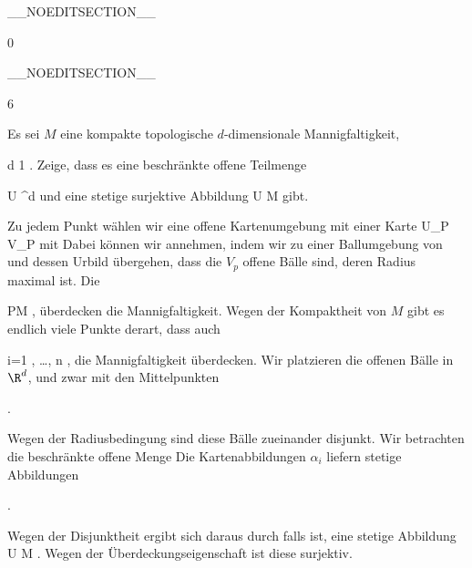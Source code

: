 __NOEDITSECTION__

{0}

{

}
{  }

__NOEDITSECTION__

{6}

{

Es sei $M$ eine kompakte topologische $d$-dimensionale Mannigfaltigkeit,

\mavergleichskette
{\vergleichskette
{ d
}
{ \geq }{ 1
}
{  }{
}
{    }{
}
{   }{
}
}
{}{}{.}
Zeige, dass es eine beschränkte offene Teilmenge

\mavergleichskette
{\vergleichskette
{ U
}
{ \subseteq }{ \R^d
}
{  }{
}
{    }{
}
{   }{
}
}
{}{}{}
und eine stetige surjektive Abbildung
\maabbdisp {\varphi} { U } { M
} {}
gibt.

}
{

Zu jedem Punkt
 wählen wir eine offene Kartenumgebung
 mit einer Karte
 {U_P } {V_P
} {}
mit
 Dabei können wir annehmen, indem wir zu einer Ballumgebung von
 und dessen Urbild übergehen, dass die $V_p$ offene Bälle sind, deren Radius maximal
 ist. Die

 {}
 {P\in M} {}
 {} {} {} {,}
überdecken die Mannigfaltigkeit. Wegen der Kompaktheit von $M$ gibt es endlich viele Punkte
 derart, dass auch

 {}
 {i=1 , \ldots , n} {}
 {} {} {} {,}
die Mannigfaltigkeit überdecken. Wir platzieren die offenen Bälle
 in
 {} {}
$\R^d$, und zwar mit den Mittelpunkten

 { . }

Wegen der Radiusbedingung sind diese Bälle zueinander disjunkt. Wir betrachten die beschränkte offene Menge
 Die Kartenabbildungen $\alpha_i$ liefern stetige Abbildungen

 { . }

Wegen der Disjunktheit ergibt sich daraus durch
 falls
 ist, eine stetige Abbildung
\maabbdisp {\varphi} { U } {M
} {.}
Wegen der Überdeckungseigenschaft ist diese surjektiv.

 }

